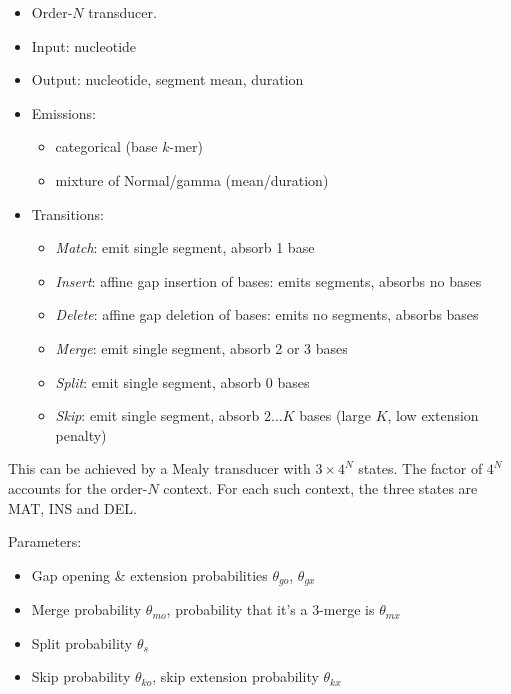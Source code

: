 \documentclass[10pt]{article}
\begin{document}
\begin{itemize}
\item Order-$N$ transducer.
\item Input: nucleotide
\item Output: nucleotide, segment mean, duration
\item Emissions:
 \begin{itemize}
 \item categorical (base $k$-mer)
 \item mixture of Normal/gamma (mean/duration)
 \end{itemize}
\item Transitions:
 \begin{itemize}
 \item {\em Match}: emit single segment, absorb 1 base
 \item {\em Insert}: affine gap insertion of bases: emits segments, absorbs no bases
 \item {\em Delete}: affine gap deletion of bases: emits no segments, absorbs bases
 \item {\em Merge}: emit single segment, absorb 2 or 3 bases
 \item {\em Split}: emit single segment, absorb 0 bases
 \item {\em Skip}: emit single segment, absorb $2 \ldots K$ bases (large $K$, low extension penalty)
 \end{itemize}
\end{itemize}

This can be achieved by a Mealy transducer with $3 \times 4^N$ states.
The factor of $4^N$ accounts for the order-$N$ context.
For each such context, the three states are MAT, INS and DEL.

\newcommand\pgapopen{\theta_{go}}
\newcommand\pgapextend{\theta_{gx}}
\newcommand\pmergeopen{\theta_{mo}}
\newcommand\pmergeextend{\theta_{mx}}
\newcommand\psplit{\theta_s}
\newcommand\pskipopen{\theta_{ko}}
\newcommand\pskipextend{\theta_{kx}}

Parameters:
 \begin{itemize}
 \item Gap opening \& extension probabilities $\pgapopen$, $\pgapextend$
 \item Merge probability $\pmergeopen$, probability that it's a 3-merge is $\pmergeextend$
 \item Split probability $\psplit$
 \item Skip probability $\pskipopen$, skip extension probability $\pskipextend$
 \end{itemize}
\end{document}
